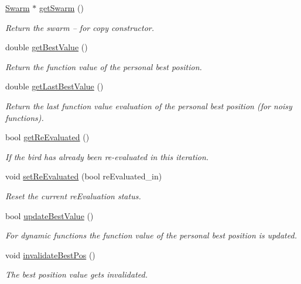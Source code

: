 \begin{CompactItemize}
\hyperlink{classSwarm}{Swarm} $\ast$ \hyperlink{classBird_20d616c42bfb4bcdb2c4517e89c70b0d}{getSwarm} ()
\begin{CompactList}\small\item\em Return the swarm -- for copy constructor. \item\end{CompactList}\item 
double \hyperlink{classBird_9e93d67d4232ccd557f4e4293ebbe8f5}{getBestValue} ()
\begin{CompactList}\small\item\em Return the function value of the personal best position. \item\end{CompactList}\item 
double \hyperlink{classBird_76259cf6591db8b1b6fae26836ab835d}{getLastBestValue} ()
\begin{CompactList}\small\item\em Return the last function value evaluation of the personal best position (for noisy functions). \item\end{CompactList}\item 
bool \hyperlink{classBird_de897774aec5007edcfca2c04a2adef1}{getReEvaluated} ()
\begin{CompactList}\small\item\em If the bird has already been re-evaluated in this iteration. \item\end{CompactList}\item 
void \hyperlink{classBird_f315e6e1f1b2eebf58f57e774e899a8f}{setReEvaluated} (bool reEvaluated\_\-in)
\begin{CompactList}\small\item\em Reset the current reEvaluation status. \item\end{CompactList}\item 
bool \hyperlink{classBird_d727d4ff5f291fa2098dbc9f609ed05b}{updateBestValue} ()
\begin{CompactList}\small\item\em For dynamic functions the function value of the personal best position is updated. \item\end{CompactList}\item 
void \hyperlink{classBird_3840ba9575ad5266bb00b2b0eba49fff}{invalidateBestPos} ()
\begin{CompactList}\small\item\em The best position value gets invalidated. \item\end{CompactList}\item 

\end{CompactItemize}
